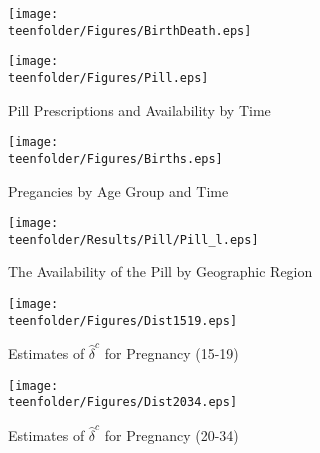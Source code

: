 \begin{figure}[htpb!]
\label{TEENfig:BirthDeath}
\texttt{[image: \\teenfolder/Figures/BirthDeath.eps]} 
\end{figure}

\begin{figure}[htpb!]
\begin{center}
\caption{Pill Prescriptions and Availability by Time}
\vspace{-5mm}
\label{TEENfig:Pilltime}
\texttt{[image: \\teenfolder/Figures/Pill.eps]} 
\end{center}
\end{figure}

\begin{figure}[htpb!]
\begin{center}
\caption{Pregancies by Age Group and Time}
\vspace{-5mm}
\label{TEENfig:Pregtime}
\texttt{[image: \\teenfolder/Figures/Births.eps]} 
\end{center}
\end{figure}

\begin{figure}[htpb!]
\begin{center}
\caption{The Availability of the Pill by Geographic Region}
\label{TEENfig:PillGeo}
\texttt{[image: \\teenfolder/Results/Pill/Pill\_l.eps]} 
\end{center}
\end{figure}

\begin{figure}[htpb!]
\begin{center}
\caption{Estimates of $\hat\delta^c$ for Pregnancy (15-19)}
\label{TEENfig:Dist1519}
\texttt{[image: \\teenfolder/Figures/Dist1519.eps]} 
\end{center}
\end{figure}

\begin{figure}[htpb!]
\begin{center}
\caption{Estimates of $\hat\delta^c$ for Pregnancy (20-34)}
\label{TEENfig:Dist2034}
\texttt{[image: \\teenfolder/Figures/Dist2034.eps]} 
\end{center}
\end{figure}

